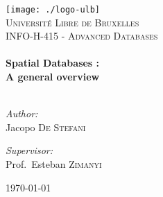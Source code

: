 \begin{titlepage}

\begin{center}


\texttt{[image: ./logo-ulb]}\\[1cm]    

\textsc{\LARGE Université Libre de Bruxelles}\\[1.5cm]

\textsc{\Large INFO-H-415 - Advanced Databases}\\[0.5cm]


\HRule \\[0.4cm]
{ \huge \bfseries Spatial Databases : \\ A general overview}\\[0.4cm]

\HRule \\[1.5cm]

\begin{minipage}{0.4\textwidth}
\begin{flushleft} \large
\emph{Author:}\\
Jacopo  \textsc{De Stefani}
\end{flushleft}
\end{minipage}
\begin{minipage}{0.4\textwidth}
\begin{flushright} \large
\emph{Supervisor:} \\
Prof.~Esteban \textsc{Zimanyi}
\end{flushright}
\end{minipage}

\vfill

{\large \today}

\end{center}

\end{titlepage}